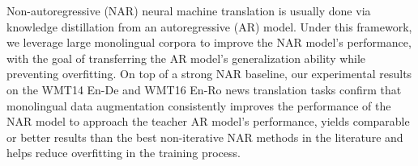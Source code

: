 Non-autoregressive (NAR) neural machine translation is usually done via knowledge distillation from an autoregressive (AR) model. Under this framework, we leverage large monolingual corpora to improve the NAR model's performance, with the goal of transferring the AR model's generalization ability while preventing overfitting. On top of a strong NAR baseline, our experimental results on the WMT14 En-De and WMT16 En-Ro news translation tasks confirm that monolingual data augmentation consistently improves the performance of the NAR model to approach the teacher AR model's performance, yields comparable or better results than the best non-iterative NAR methods in the literature and helps reduce overfitting in the training process.
